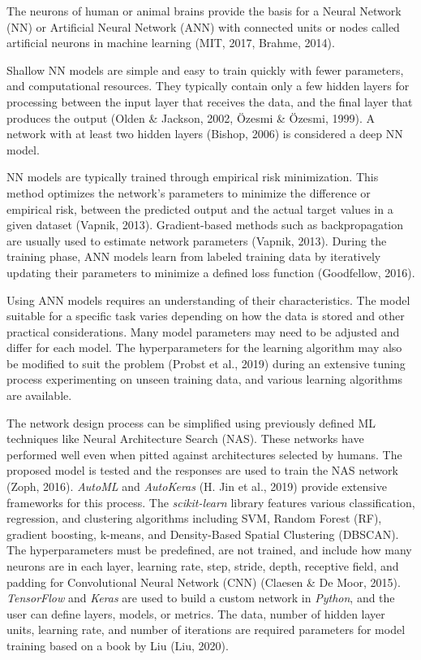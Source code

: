 \documentclass[sn-mathphys-num]{sn-jnl}%
\begin{document}
The neurons of human or animal brains provide the basis for a Neural Network (NN) or Artificial Neural Network (ANN) with connected units or nodes called artificial neurons in machine learning (MIT, 2017, Brahme, 2014). 

Shallow NN models are simple and easy to train quickly with fewer parameters, and computational resources. They typically contain only a few hidden layers for processing between the input layer that receives the data, and the final layer that produces the output (Olden & Jackson, 2002, Özesmi & Özesmi, 1999).  A network with at least two hidden layers (Bishop, 2006) is considered a deep NN model.

NN models are typically trained through empirical risk minimization. This method optimizes the network's parameters to minimize the difference or empirical risk, between the predicted output and the actual target values in a given dataset (Vapnik, 2013). Gradient-based methods such as backpropagation are usually used to estimate network parameters  (Vapnik, 2013). During the training phase, ANN models learn from labeled training data by iteratively updating their parameters to minimize a defined loss function (Goodfellow, 2016).

Using ANN models requires an understanding of their characteristics. The model suitable for a specific task varies depending on how the data is stored and other practical considerations. Many model parameters may need to be adjusted and differ for each model. The hyperparameters for the learning algorithm may also be modified to suit the problem (Probst et al., 2019) during an extensive tuning process experimenting on unseen training data, and various learning algorithms are available.

The network design process can be simplified using previously defined ML techniques like Neural Architecture Search (NAS). These networks have performed well even when pitted against architectures selected by humans. The proposed model is tested and the responses are used to train the NAS network (Zoph, 2016). \textit{AutoML} and \textit{AutoKeras} (H. Jin et al., 2019) provide extensive frameworks for this process. The \textit{scikit-learn} library features various classification, regression, and clustering algorithms including SVM, Random Forest (RF), gradient boosting, k-means, and Density-Based Spatial Clustering (DBSCAN). The hyperparameters must be predefined, are not trained, and include how many neurons are in each layer, learning rate, step, stride, depth, receptive field, and padding for Convolutional Neural Network (CNN) (Claesen & De Moor, 2015). \textit{TensorFlow} and \textit{Keras} are used to build a custom network in \textit{Python}, and the user can define layers, models, or metrics. The data, number of hidden layer units, learning rate, and number of iterations are required parameters for model training based on a book by Liu (Liu, 2020).
\end{document}
